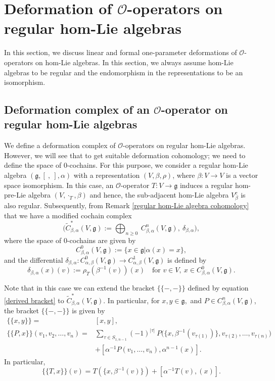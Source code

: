 \documentclass[a4paper,11pt]{amsart}
\theoremstyle{plain}
\theoremstyle{definition}
\theoremstyle{remark}
\numberwithin{equation}{section}
\begin{document}
\section{\normalfont\large\textbf{Deformation of $\mathcal{O}$-operators on regular hom-Lie algebras}}
In this section, we discuss linear and formal one-parameter deformations of $\mathcal{O}$-operators on hom-Lie algebras. In this section, we always assume hom-Lie algebras to be regular and the endomorphism in the representations to be an isomorphism. 

\subsection{Deformation complex of an $\mathcal{O}$-operator on regular hom-Lie algebras}
 We define a deformation complex of $\mathcal{O}$-operators on regular hom-Lie algebras. However, we will see that to get suitable deformation cohomology; we need to define the space of $0$-cochains. For this purpose, we consider a regular hom-Lie algebra $(\mathfrak{g},[~,~],\alpha)$ with a representation $(V,\beta,\rho)$, where $\beta:V\rightarrow V$ is a vector space isomorphism. In this case, an $\mathcal{O}$-operator $T:V\rightarrow \mathfrak{g}$ induces a regular hom-pre-Lie algebra $(V,\cdot_T,\beta)$ and hence, the sub-adjacent hom-Lie algebra $V_{\beta}^c$ is also regular.
Subsequently, from Remark \ref{regular hom-Lie algebra cohomology} that we have a modified cochain complex 
$$\bigg(\widetilde{C}^*_{\beta,\alpha}(V,\mathfrak{g}):=\bigoplus_{n\geq 0}~C^n_{\beta,\alpha}(V,\mathfrak{g}),~\delta_{\beta,\alpha}\bigg),$$
where the space of $0$-cochains are given by 
$$C^0_{\beta,\alpha}(V,\mathfrak{g}):=\{x\in \mathfrak{g}| \alpha(x)=x\},$$
and the differential $\delta_{\beta,\alpha}:C^0_{\alpha,\beta}(V,\mathfrak{g})\rightarrow C^1_{\alpha,\beta}(V,\mathfrak{g})$ is defined by 
\begin{equation}\label{diff_0:1}
\delta_{\beta,\alpha}(x)(v):=\rho_T(\beta^{-1}(v))(x)\quad\mbox{for }v\in V,~x\in C^0_{\beta,\alpha}(V,\mathfrak{g}).
\end{equation}

Note that in this case we can extend the bracket $\{\!\!\{-,- \}\!\!\}$ defined by equation \eqref{derived bracket} to $\widetilde{C}^*_{\beta,\alpha}(V,\mathfrak{g})$. In particular, for $x,y\in\mathfrak{g},$ and $P\in C^n_{\beta,\alpha}(V,\mathfrak{g})$, the bracket $\{\!\!\{-,- \}\!\!\}$ is given by 
\begin{align}
\nonumber
\{\!\!\{x,y\}\!\!\}=&[x,y],\\\nonumber
\{\!\!\{P,x\}\!\!\}(v_1,v_2,\ldots,v_{n})=&\sum_{\tau\in S_{1,n-1}}(-1)^{|\tau|}~ P\Big(\{x,\beta^{-1}(v_{\tau(1)})\},v_{\tau(2)},\ldots, v_{\tau(n)} \Big)\\\nonumber
&+[\alpha^{-1}P(v_{1},\ldots,v_{n}),\alpha^{n-1}(x)].
\end{align}
In particular, 
\begin{equation}\label{diff_0:2}
\{\!\!\{T,x\}\!\!\}(v)= T(\{x,\beta^{-1}(v)\})+[\alpha^{-1}T(v),(x)].
\end{equation}
\end{document}

